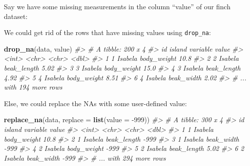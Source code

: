 \documentclass[]{book}
\newenvironment{Shaded}{}{}
\newcommand{\CommentTok}[1]{\textcolor[rgb]{0.38,0.63,0.69}{\textit{#1}}}
\newcommand{\DataTypeTok}[1]{\textcolor[rgb]{0.56,0.13,0.00}{#1}}
\newcommand{\DecValTok}[1]{\textcolor[rgb]{0.25,0.63,0.44}{#1}}
\newcommand{\KeywordTok}[1]{\textcolor[rgb]{0.00,0.44,0.13}{\textbf{#1}}}
\newcommand{\NormalTok}[1]{#1}
\newcommand{\OperatorTok}[1]{\textcolor[rgb]{0.40,0.40,0.40}{#1}}
\newcommand{\OtherTok}[1]{\textcolor[rgb]{0.00,0.44,0.13}{#1}}
\newcommand{\StringTok}[1]{\textcolor[rgb]{0.25,0.44,0.63}{#1}}
\begin{document}
Say we have some missing measurements in the column ``value'' of our finch dataset:

\begin{Shaded}
\end{Shaded}

We could get rid of the rows that have missing values using \texttt{drop\_na}:

\begin{Shaded}
\begin{Highlighting}[]
\KeywordTok{drop_na}\NormalTok{(data, value)}
\CommentTok{#> # A tibble: 200 x 4}
\CommentTok{#>      id island  variable    value}
\CommentTok{#>   <int> <chr>   <chr>       <dbl>}
\CommentTok{#> 1     1 Isabela body_weight 10.8 }
\CommentTok{#> 2     2 Isabela beak_length  5.02}
\CommentTok{#> 3     3 Isabela body_weight 15.0 }
\CommentTok{#> 4     3 Isabela beak_length  4.92}
\CommentTok{#> 5     4 Isabela body_weight  8.51}
\CommentTok{#> 6     4 Isabela beak_width   2.02}
\CommentTok{#> # ... with 194 more rows}
\end{Highlighting}
\end{Shaded}

Else, we could replace the NAs with some user-defined value:

\begin{Shaded}
\begin{Highlighting}[]
\KeywordTok{replace_na}\NormalTok{(data, }\DataTypeTok{replace =} \KeywordTok{list}\NormalTok{(}\DataTypeTok{value =} \DecValTok{-999}\NormalTok{))}
\CommentTok{#> # A tibble: 300 x 4}
\CommentTok{#>      id island  variable      value}
\CommentTok{#>   <int> <chr>   <chr>         <dbl>}
\CommentTok{#> 1     1 Isabela body_weight   10.8 }
\CommentTok{#> 2     1 Isabela beak_length -999   }
\CommentTok{#> 3     1 Isabela beak_width  -999   }
\CommentTok{#> 4     2 Isabela body_weight -999   }
\CommentTok{#> 5     2 Isabela beak_length    5.02}
\CommentTok{#> 6     2 Isabela beak_width  -999   }
\CommentTok{#> # ... with 294 more rows}
\end{Highlighting}
\end{Shaded}
\end{document}
